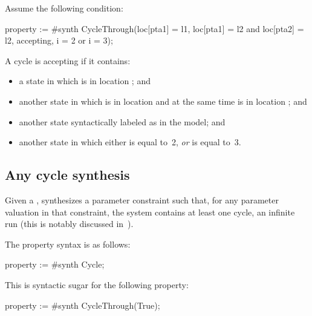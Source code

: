 \begin{example}
	Assume the following condition:

\begin{IMITATORproperty}
property := #synth CycleThrough(loc[pta1] = l1, loc[pta1] = l2 and loc[pta2] = l2, accepting, i = 2 or i = 3);
\end{IMITATORproperty}

A cycle is accepting if it contains:
\begin{itemize}
	\item a state in which  is in location ; and
	\item another state in which  is in location  and at the same time  is in location ; and
	\item another state syntactically labeled as  in the model; and
	\item another state in which either  is equal to~2, \emph{or}  is equal to~3.
\end{itemize}


\end{example}


\subsection{Any cycle synthesis}\label{ss:loop}


Given a \NIPTA{}, \imitator{} synthesizes a parameter constraint such that, for any parameter valuation in that constraint, the system contains at least one cycle, \ie{} an infinite run (this is notably discussed in~\cite{ALime17}).

The property syntax is as follows:

\begin{IMITATORproperty}
property := #synth Cycle;
\end{IMITATORproperty}

This is syntactic sugar for the following property:

\begin{IMITATORproperty}
property := #synth CycleThrough(True);
\end{IMITATORproperty}

